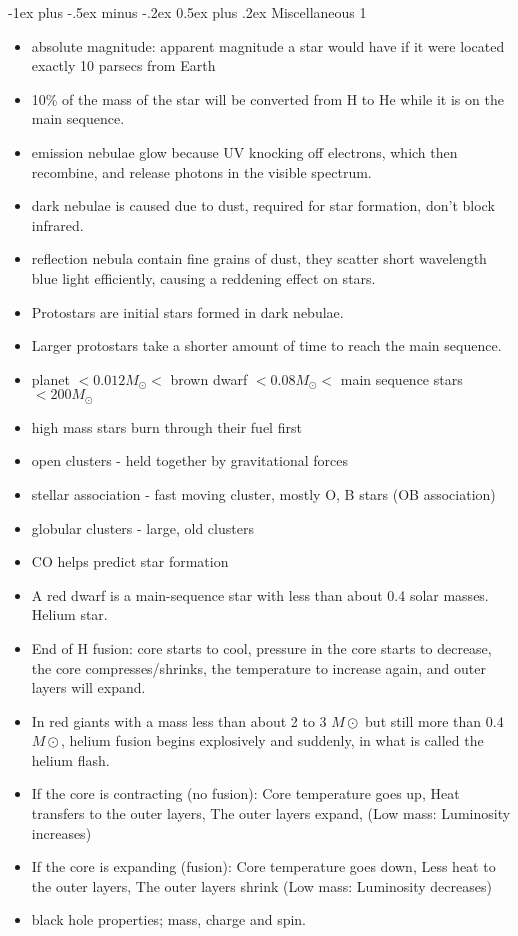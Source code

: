 \documentclass[10pt,landscape]{article}
\makeatletter
\renewcommand{\section}{\@startsection{section}{1}{0mm}%
                                {-1ex plus -.5ex minus -.2ex}%
                                {0.5ex plus .2ex}%
                                {\normalfont\large\bfseries}}
\makeatother
\begin{document}
\begin{multicols}{3}
\section{Miscellaneous 1}
\begin{itemize}
    \item absolute magnitude: apparent magnitude a star would have if it were located exactly 10 parsecs from Earth
    \item 10\% of the mass of the star will be converted from H to He while it is on the main sequence.
    \item emission nebulae glow because UV knocking off electrons, which then recombine, and release photons in the visible spectrum.
    \item dark nebulae is caused due to dust, required for star formation, don't block infrared.
    \item reflection nebula contain fine grains of dust, they scatter short wavelength blue light efficiently, causing a reddening effect on stars.
    \item Protostars are initial stars formed in dark nebulae. 
    \item Larger protostars take a shorter amount of time to reach the main sequence.
    \item planet $< 0.012 M_\odot <$ brown dwarf $< 0.08 M_\odot <$ main sequence stars $< 200 M_\odot$
    \item high mass stars burn through their fuel first
    \item open clusters - held together by gravitational forces
    \item stellar association - fast moving cluster, mostly O, B stars (OB association)
    \item globular clusters - large, old clusters
    \item CO helps predict star formation
    \item A red dwarf is a main-sequence star with less than about 0.4 solar masses. Helium star.
    \item End of H fusion: core starts to cool, pressure in the core starts to decrease, the core compresses/shrinks, the temperature to increase again, and outer layers will expand.
    \item In red giants with a mass less than about 2 to 3 $M\odot$ but still more than 0.4 $M\odot$, helium fusion begins explosively and suddenly, in what is called the helium flash. 
    \item If the core is contracting (no fusion): Core temperature goes up, Heat transfers to the outer layers, The outer layers expand, (Low mass: Luminosity increases)
    \item If the core is expanding (fusion): Core temperature goes down, Less heat to the outer layers, The outer layers shrink (Low mass: Luminosity decreases)
    \item black hole properties; mass, charge and spin.
\end{itemize}

\end{multicols}
\end{document}
